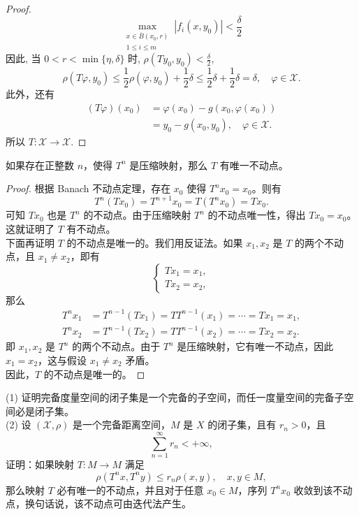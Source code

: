 \documentclass[lang=cn,newtx,10pt,scheme=chinese,thmcnt=chapter]{elegantbook}
\begin{document}
\begin{proof}
\begin{equation*}
\max_{\substack{x \in \bar{B}(x_0, r) \\ 1 \leqslant i \leqslant m}} \left|f_i(x, y_0)\right| < \frac{\delta}{2}
\end{equation*}
因此, 当 \( 0 < r < \min\{\eta, \delta\} \) 时, \( \rho(T y_0, y_0) < \frac{\delta}{2} \),
\begin{equation*}
\rho(T \varphi, y_0) \leqslant \frac{1}{2} \rho(\varphi, y_0) + \frac{1}{2} \delta \leqslant \frac{1}{2} \delta + \frac{1}{2} \delta = \delta, \quad \varphi \in \mathscr{X}.
\end{equation*}
此外，还有
\begin{equation*}
\begin{aligned}
(T \varphi)(x_0) & = \varphi(x_0) - g(x_0, \varphi(x_0)) \\
& = y_0 - g(x_0, y_0), \quad \varphi \in \mathscr{X}.
\end{aligned}
\end{equation*}
所以 \( T: \mathscr{X} \rightarrow \mathscr{X} \).
\end{proof}
\begin{example}
如果存在正整数 \( n \)，使得 \( T^n \) 是压缩映射，那么 \( T \) 有唯一不动点。
\end{example}

\begin{proof}
根据 Banach 不动点定理，存在 \( x_0 \) 使得 \( T^n x_0 = x_0 \)。则有
\[
T^n(T x_0) = T^{n+1} x_0 = T(T^n x_0) = T x_0.
\]
可知 \( T x_0 \) 也是 \( T^n \) 的不动点。由于压缩映射 \( T^n \) 的不动点唯一性，得出 \( T x_0 = x_0 \)。
这就证明了 \( T \) 有不动点。\\
下面再证明 \( T \) 的不动点是唯一的。我们用反证法。如果 \( x_1, x_2 \) 是 \( T \) 的两个不动点，且 \( x_1 \neq x_2 \)，即有
\[
\begin{cases}
T x_1 = x_1, \\
T x_2 = x_2,
\end{cases}
\]
那么
\[
\begin{aligned}
T^n x_1 &= T^{n-1}(T x_1) =T T^{n-1}(x_1) = \cdots = T x_1 = x_1, \\
T^n x_2 &= T^{n-1}(T x_2) =TT^{n-1}(x_2) = \cdots = T x_2 = x_2.
\end{aligned}
\]
即 \( x_1, x_2 \) 是 \( T^n \) 的两个不动点。由于 \( T^n \) 是压缩映射，它有唯一不动点，因此 \( x_1 = x_2 \)，这与假设 \( x_1 \neq x_2 \) 矛盾。\\
因此，\( T \) 的不动点是唯一的。
\end{proof}
\begin{example}
(1) 证明完备度量空间的闭子集是一个完备的子空间，而任一度量空间的完备子空间必是闭子集。\\
(2) 设 \( (\mathscr{X}, \rho) \) 是一个完备距离空间，\( M \) 是 \( X \) 的闭子集，且有 \( r_n > 0 \)，且
\[
\sum_{n=1}^{\infty} r_n < +\infty,
\]
证明：如果映射 \( T: M \to M \) 满足
\[
\rho(T^n x, T^n y) \leqslant r_n \rho(x, y), \quad x, y \in M,
\]
那么映射 \( T \) 必有唯一的不动点，并且对于任意 \( x_0 \in M \)，序列 \( T^n x_0 \) 收敛到该不动点，换句话说，该不动点可由迭代法产生。
\end{example}
\end{document}
